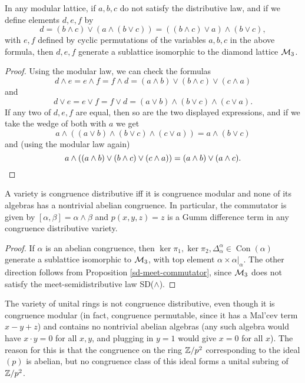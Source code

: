 \documentclass[letterpaper,11pt]{article}
\DeclareMathOperator{\Con}{Con}
\begin{document}
\begin{prop}\label{distributive-m3} In any modular lattice, if $a,b,c$ do not satisfy the distributive law, and if we define elements $d,e,f$ by
\[
d = (b \wedge c) \vee (a \wedge (b \vee c)) = ((b\wedge c) \vee a)\wedge (b\vee c),
\]
with $e,f$ defined by cyclic permutations of the variables $a,b,c$ in the above formula, then $d,e,f$ generate a sublattice isomorphic to the diamond lattice $\mathcal{M}_3$.
\end{prop}
\begin{proof} Using the modular law, we can check the formulas
\[
d \wedge e = e \wedge f = f \wedge d = (a\wedge b)\vee (b\wedge c) \vee (c \wedge a)
\]
and
\[
d \vee e = e \vee f = f \vee d = (a\vee b)\wedge (b\vee c) \wedge (c \vee a).
\]
If any two of $d,e,f$ are equal, then so are the two displayed expressions, and if we take the wedge of both with $a$ we get
\[
a \wedge ((a\vee b)\wedge (b\vee c) \wedge (c \vee a)) = a \wedge (b \vee c)
\]
and (using the modular law again)
\[
a\wedge ((a\wedge b)\vee (b\wedge c) \vee (c \wedge a)) = (a \wedge b) \vee (a \wedge c).\qedhere
\]
\end{proof}

\begin{prop} A variety is congruence distributive iff it is congruence modular and none of its algebras has a nontrivial abelian congruence. In particular, the commutator is given by $[\alpha,\beta] = \alpha\wedge \beta$ and $p(x,y,z) = z$ is a Gumm difference term in any congruence distributive variety.
\end{prop}
\begin{proof} If $\alpha$ is an abelian congruence, then $\ker \pi_1, \ker \pi_2, \Delta_\alpha^\alpha \in \Con(\alpha)$ generate a sublattice isomorphic to $\mathcal{M}_3$, with top element $\alpha \times \alpha|_\alpha$. The other direction follows from Proposition \ref{sd-meet-commutator}, since $\mathcal{M}_3$ does not satisfy the meet-semidistributive law SD($\wedge$).
\end{proof}

\begin{ex} The variety of unital rings is not congruence distributive, even though it is congruence modular (in fact, congruence permutable, since it has a Mal'cev term $x-y+z$) and contains no nontrivial abelian algebras (any such algebra would have $x\cdot y = 0$ for all $x,y$, and plugging in $y = 1$ would give $x = 0$ for all $x$). The reason for this is that the congruence on the ring $\mathbb{Z}/p^2$ corresponding to the ideal $(p)$ is abelian, but no congruence class of this ideal forms a unital subring of $\mathbb{Z}/p^2$.
\end{ex}
\end{document}
